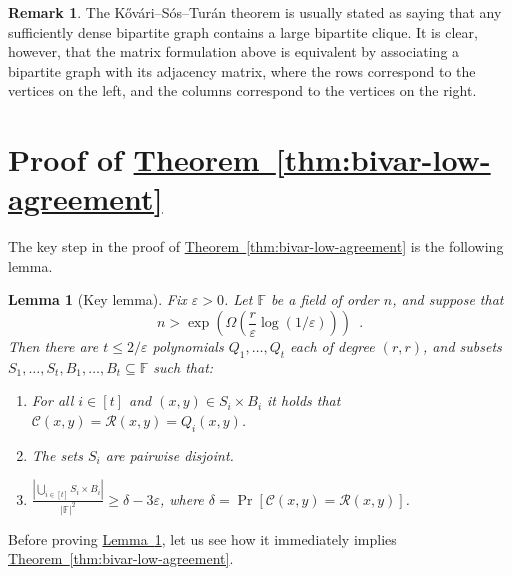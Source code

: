 \documentclass[11pt]{article}
\numberwithin{equation}{section}
\newtheorem{lemma}[theorem]{Lemma}
\theoremstyle{definition}
\newtheorem{remark}[theorem]{Remark}
\theoremstyle{plain}
\newcommand{\expref}[2]{\hyperref[#2]{#1~\ref{#2}}}
\theoremstyle{plain}
\newcommand{\colored}{}
\newcommand{\blocklength}{\colored{n}} %
\newcommand{\Field}{\colored{\mathbb F}}
\newcommand{\degree}{\colored{r}}
\newcommand{\rowpoly}{\colored{\mathcal R}}
\newcommand{\colpoly}{\colored{\mathcal C}}
\newcommand{\prox}{\colored{\delta}}
\newcommand{\eps}{\varepsilon}
\newcommand\abs[1]{\colored{\left|#1\right|}}
\begin{document}
\begin{remark}
  The %
K\H{o}v\'{a}ri--S\'{o}s--Tur\'{a}n   %
  theorem is usually stated as saying that
    any sufficiently dense bipartite graph contains a large bipartite clique.
    It is clear, however, that the matrix formulation above is equivalent
    by associating a bipartite graph with its adjacency matrix, where the rows correspond to the vertices
    on the left, and the columns correspond to the vertices on the right.
\end{remark}
%
%




%
%
%
\section{Proof of \expref{Theorem}{thm:bivar-low-agreement}}
\label{sec:proof2}

The key step in the proof of \expref{Theorem}{thm:bivar-low-agreement} is the following lemma.

\begin{lemma}[Key lemma]\label{lemma:key}
  Fix $\eps > 0$. Let $\Field$ be a field of
%
  order %
  $\blocklength$, and suppose that
  \[
    \blocklength > \exp\left(\Omega\left(\frac{\degree}{\eps}
    \log({1}/{\eps})\right)\right)\enspace.
  \]
  Then there are $t \leq {2}/{\eps}$ polynomials $Q_1,\dots,Q_t$
  each of degree $(\degree,\degree)$, and subsets
  $S_1,\dots,S_t,B_1,\dots,B_t \subseteq \Field$ such that:
    \begin{enumerate}
        \item
            For all $i \in [t]$ and $(x,y) \in S_i \times B_i$ it holds that $\colpoly(x,y) = \rowpoly(x,y) = Q_i(x,y)$.
        \item
%
%
          The sets $S_i$ are pairwise disjoint.                 %
%
%
        \item
%
  $\displaystyle{\frac{\abs{\bigcup_{i \in [t]} S_i \times B_i}}{\abs{\Field}^2} \geq \prox - 3\eps}$,          %
            where $\prox = \Pr[\colpoly(x,y) = \rowpoly(x,y)]$.
    \end{enumerate}
\end{lemma}

Before proving \expref{Lemma}{lemma:key}, let us see how it immediately implies \expref{Theorem}{thm:bivar-low-agreement}.
\end{document}
